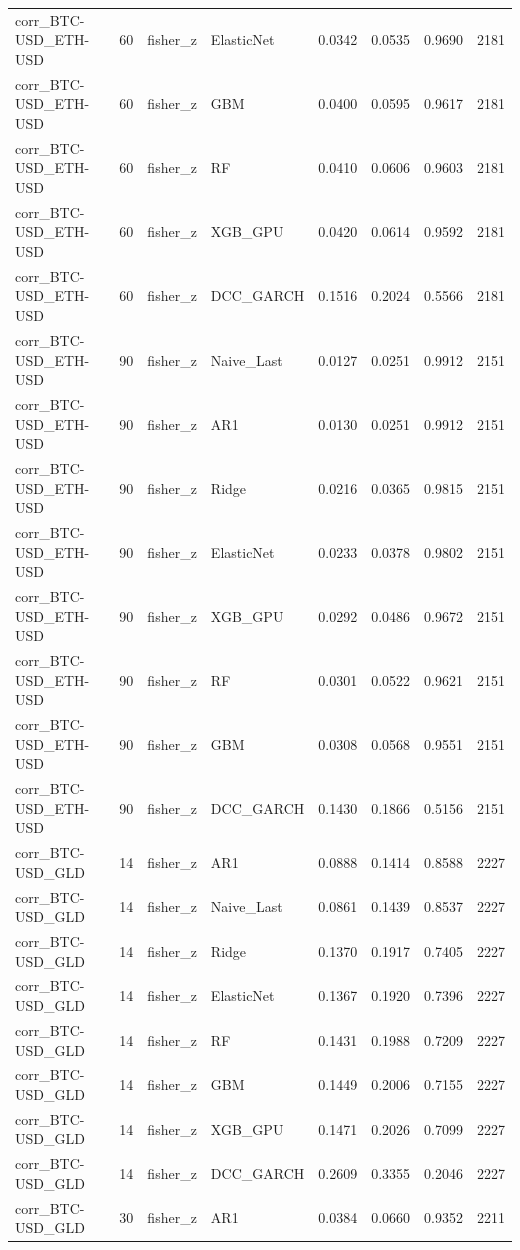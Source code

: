 \begin{table}[H]
\begin{tabular}{llllrrrr}
corr_BTC-USD_ETH-USD & 60 & fisher_z & ElasticNet & 0.0342 & 0.0535 & 0.9690 & 2181 \\
corr_BTC-USD_ETH-USD & 60 & fisher_z & GBM & 0.0400 & 0.0595 & 0.9617 & 2181 \\
corr_BTC-USD_ETH-USD & 60 & fisher_z & RF & 0.0410 & 0.0606 & 0.9603 & 2181 \\
corr_BTC-USD_ETH-USD & 60 & fisher_z & XGB_GPU & 0.0420 & 0.0614 & 0.9592 & 2181 \\
corr_BTC-USD_ETH-USD & 60 & fisher_z & DCC_GARCH & 0.1516 & 0.2024 & 0.5566 & 2181 \\
corr_BTC-USD_ETH-USD & 90 & fisher_z & Naive_Last & 0.0127 & 0.0251 & 0.9912 & 2151 \\
corr_BTC-USD_ETH-USD & 90 & fisher_z & AR1 & 0.0130 & 0.0251 & 0.9912 & 2151 \\
corr_BTC-USD_ETH-USD & 90 & fisher_z & Ridge & 0.0216 & 0.0365 & 0.9815 & 2151 \\
corr_BTC-USD_ETH-USD & 90 & fisher_z & ElasticNet & 0.0233 & 0.0378 & 0.9802 & 2151 \\
corr_BTC-USD_ETH-USD & 90 & fisher_z & XGB_GPU & 0.0292 & 0.0486 & 0.9672 & 2151 \\
corr_BTC-USD_ETH-USD & 90 & fisher_z & RF & 0.0301 & 0.0522 & 0.9621 & 2151 \\
corr_BTC-USD_ETH-USD & 90 & fisher_z & GBM & 0.0308 & 0.0568 & 0.9551 & 2151 \\
corr_BTC-USD_ETH-USD & 90 & fisher_z & DCC_GARCH & 0.1430 & 0.1866 & 0.5156 & 2151 \\
corr_BTC-USD_GLD & 14 & fisher_z & AR1 & 0.0888 & 0.1414 & 0.8588 & 2227 \\
corr_BTC-USD_GLD & 14 & fisher_z & Naive_Last & 0.0861 & 0.1439 & 0.8537 & 2227 \\
corr_BTC-USD_GLD & 14 & fisher_z & Ridge & 0.1370 & 0.1917 & 0.7405 & 2227 \\
corr_BTC-USD_GLD & 14 & fisher_z & ElasticNet & 0.1367 & 0.1920 & 0.7396 & 2227 \\
corr_BTC-USD_GLD & 14 & fisher_z & RF & 0.1431 & 0.1988 & 0.7209 & 2227 \\
corr_BTC-USD_GLD & 14 & fisher_z & GBM & 0.1449 & 0.2006 & 0.7155 & 2227 \\
corr_BTC-USD_GLD & 14 & fisher_z & XGB_GPU & 0.1471 & 0.2026 & 0.7099 & 2227 \\
corr_BTC-USD_GLD & 14 & fisher_z & DCC_GARCH & 0.2609 & 0.3355 & 0.2046 & 2227 \\
corr_BTC-USD_GLD & 30 & fisher_z & AR1 & 0.0384 & 0.0660 & 0.9352 & 2211 \\

\end{tabular}
\end{table}
